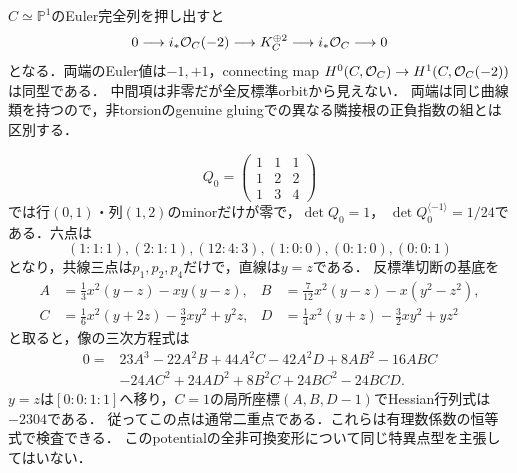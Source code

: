 \begin{remark}[正負指数の完全相殺の古典模型]
$C\simeq\mathbb P^1$のEuler完全列を押し出すと
\[
 0\longrightarrow i_*\mathcal O_C(-2)\longrightarrow K_C^{\oplus2}
 \longrightarrow i_*\mathcal O_C\longrightarrow0
\]
となる．両端のEuler値は$-1,+1$，connecting map
$H^0(C,\mathcal O_C)\to H^1(C,\mathcal O_C(-2))$は同型である．
中間項は非零だが全反標準orbitから見えない．
両端は同じ曲線類を持つので，非torsionのgenuine gluingでの異なる隣接根の正負指数の組とは区別する．
\end{remark}

\begin{example}[有理数上の一壁と反標準方程式]\label{ex:zero-rational-wall}
\[
 Q_0=\begin{pmatrix}1&1&1\\1&2&2\\1&3&4\end{pmatrix}
\]
では行$(0,1)$・列$(1,2)$のminorだけが零で，$\det Q_0=1$，
$\det Q_0^{\langle-1\rangle}=1/24$である．六点は
\[
 (1:1:1),(2:1:1),(12:4:3),(1:0:0),(0:1:0),(0:0:1)
\]
となり，共線三点は$p_1,p_2,p_4$だけで，直線は$y=z$である．
反標準切断の基底を
\[
\begin{aligned}
 A&=\tfrac13x^2(y-z)-xy(y-z),&
 B&=\tfrac7{12}x^2(y-z)-x(y^2-z^2),\\
 C&=\tfrac16x^2(y+2z)-\tfrac32xy^2+y^2z,&
 D&=\tfrac14x^2(y+z)-\tfrac32xy^2+yz^2
\end{aligned}
\]
と取ると，像の三次方程式は
\[
\begin{aligned}
 0={}&23A^3-22A^2B+44A^2C-42A^2D+8AB^2-16ABC\\
 &-24AC^2+24AD^2+8B^2C+24BC^2-24BCD.
\end{aligned}
\]
$y=z$は$[0:0:1:1]$へ移り，$C=1$の局所座標$(A,B,D-1)$でHessian行列式は$-2304$である．
従ってこの点は通常二重点である．これらは有理数係数の恒等式で検査できる．
このpotentialの全非可換変形について同じ特異点型を主張してはいない．
\end{example}

